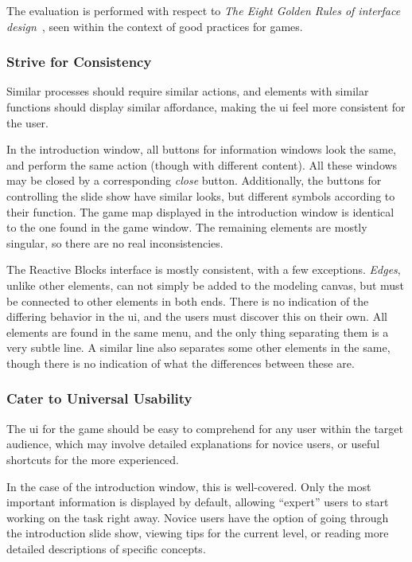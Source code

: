 \noindent
The evaluation is performed with respect to \emph{The Eight Golden Rules of interface design}~\cite{shneiderman:user_interface}, seen within the context of good practices for games.

\subsubsection{Strive for Consistency}
Similar processes should require similar actions, and elements with similar functions should display similar affordance, making the \gls{ui} feel more consistent for the user.

\noindent
In the introduction window, all buttons for information windows look the same, and perform the same action (though with different content). All these windows may be closed by a corresponding \emph{close} button. Additionally, the buttons for controlling the slide show have similar looks, but different symbols according to their function. The game map displayed in the introduction window is identical to the one found in the game window. The remaining elements are mostly singular, so there are no real inconsistencies.

\noindent
The Reactive Blocks interface is mostly consistent, with a few exceptions. \emph{Edges}, unlike other elements, can not simply be added to the modeling canvas, but must be connected to other elements in both ends. There is no indication of the differing behavior in the \gls{ui}, and the users must discover this on their own. All elements are found in the same menu, and the only thing separating them is a very subtle line. A similar line also separates some other elements in the same, though there is no indication of what the differences between these are.

\subsubsection{Cater to Universal Usability}
The \gls{ui} for the game should be easy to comprehend for any user within the target audience, which may involve detailed explanations for novice users, or useful shortcuts for the more experienced.

\noindent
In the case of the introduction window, this is well-covered. Only the most important information is displayed by default, allowing ``expert'' users to start working on the task right away. Novice users have the option of going through the introduction slide show, viewing tips for the current level, or reading more detailed descriptions of specific concepts.

